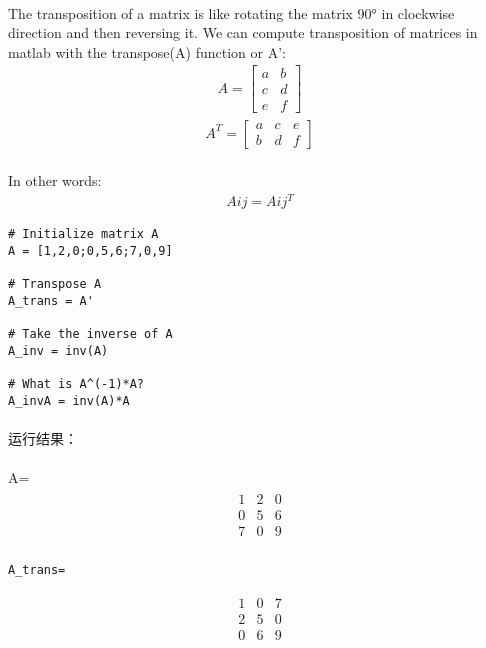 \documentclass{article}
\begin{document}
\begin{CJK}{UTF8}{gbsn}
\paragraph{}
The transposition of a matrix is like rotating the matrix 90° in clockwise direction and then reversing it. We can compute transposition of matrices in matlab with the transpose(A) function or A':
\begin{eqnarray*}
A=
\left[\begin{array}{cc}
a&b\\
c&d\\
e&f
\end{array}\right]
\end{eqnarray*}
\begin{eqnarray*}
A^{T}=
\left[\begin{array}{ccc}
a&c&e\\
b&d&f
\end{array}\right]
\end{eqnarray*}
\paragraph{}
In other words:
\begin{eqnarray*}
A{ij}=A{ij}^{T}
\end{eqnarray*}
\begin{verbatim}
# Initialize matrix A 
A = [1,2,0;0,5,6;7,0,9]

# Transpose A 
A_trans = A' 

# Take the inverse of A 
A_inv = inv(A)

# What is A^(-1)*A? 
A_invA = inv(A)*A
\end{verbatim}
\paragraph{}
运行结果：
\paragraph{}
\hspace*{4cm}
A=
\begin{eqnarray*}
\begin{array}{ccc}
1&2&0\\
0&5&6\\
7&0&9
\end{array}
\end{eqnarray*}
\paragraph{}
\hspace*{4cm}
\begin{verbatim}
A_trans=
\end{verbatim}
\begin{eqnarray*}
\begin{array}{ccc}
1&0&7\\
2&5&0\\
0&6&9
\end{array}
\end{eqnarray*}

\end{CJK}
\end{document}

